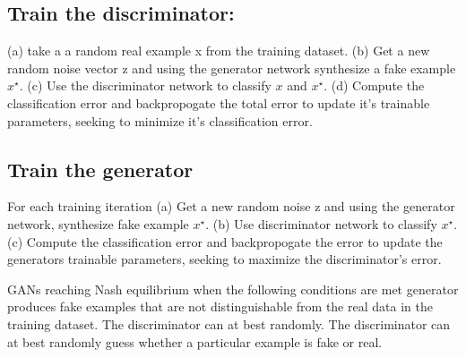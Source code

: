 \subsection{Train the discriminator:}
(a) take a a random real example x from the training dataset. (b) Get a new random noise vector z and using the generator network synthesize a fake example  $x^{\star}$. (c) Use the discriminator network to classify  $x$ and  $x^{\star}$. (d) Compute the classification error and backpropogate the total error to update it's trainable parameters, seeking to minimize it's classification error. 

\subsection{Train the generator}
For each training iteration
(a) Get a new random noise z and using the generator network, synthesize fake example $x^{\star}$. (b) Use discriminator network to classify $x^{\star}$. (c) Compute the classification error and backpropogate the error to update the generators trainable parameters, seeking to maximize the discriminator's error. 

GANs reaching Nash equilibrium when the following conditions are met generator produces fake examples that are not distinguishable from the real data in the training dataset. The discriminator can at best randomly. The discriminator can at best randomly guess whether a particular example is fake or real.  

 